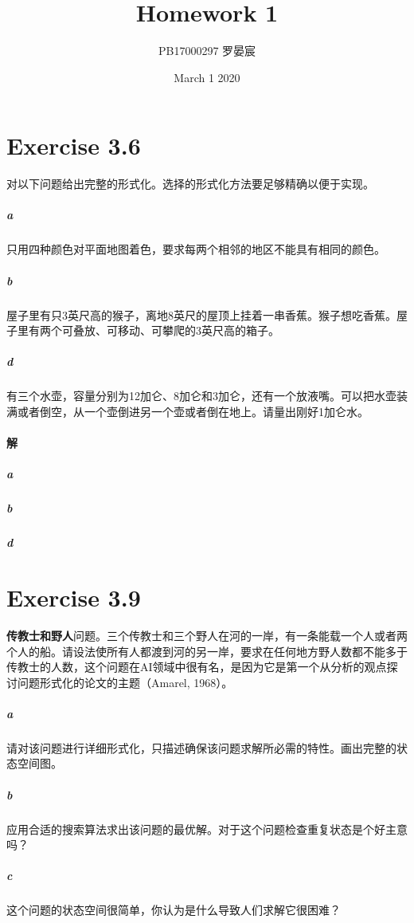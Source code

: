 \documentclass{article}
\title{Homework 1}
\author{PB17000297 罗晏宸}
\date{March 1 2020}
\begin{document}
\maketitle

\section{Exercise 3.6}
对以下问题给出完整的形式化。选择的形式化方法要足够精确以便于实现。
\subparagraph{a}
只用四种颜色对平面地图着色，要求每两个相邻的地区不能具有相同的颜色。
\subparagraph{b}
屋子里有只3英尺高的猴子，离地8英尺的屋顶上挂着一串香蕉。猴子想吃香蕉。屋子里有两个可叠放、可移动、可攀爬的3英尺高的箱子。
\subparagraph{d}
有三个水壶，容量分别为12加仑、8加仑和3加仑，还有一个放液嘴。可以把水壶装满或者倒空，从一个壶倒进另一个壶或者倒在地上。请量出刚好1加仑水。

\paragraph{解}
\subparagraph{a}
\subparagraph{b}
\subparagraph{d}

\section{Exercise 3.9}
\textbf{传教士和野人}问题。三个传教士和三个野人在河的一岸，有一条能载一个人或者两个人的船。请设法使所有人都渡到河的另一岸，要求在任何地方野人数都不能多于传教士的人数，这个问题在AI领域中很有名，是因为它是第一个从分析的观点探讨问题形式化的论文的主题（Amarel, 1968）。
\subparagraph{a}
请对该问题进行详细形式化，只描述确保该问题求解所必需的特性。画出完整的状态空间图。
\subparagraph{b}
应用合适的搜索算法求出该问题的最优解。对于这个问题检查重复状态是个好主意吗？
\subparagraph{c}
这个问题的状态空间很简单，你认为是什么导致人们求解它很困难？
\end{document}
